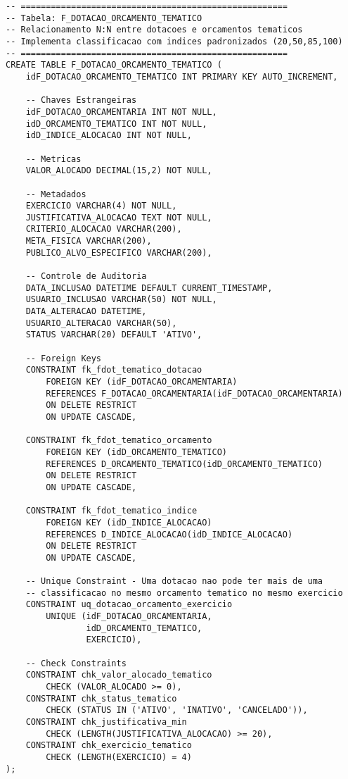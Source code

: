 \documentclass[12pt,a4paper]{article}
\begin{document}
\begin{lstlisting}
-- =====================================================
-- Tabela: F_DOTACAO_ORCAMENTO_TEMATICO
-- Relacionamento N:N entre dotacoes e orcamentos tematicos
-- Implementa classificacao com indices padronizados (20,50,85,100)
-- =====================================================
CREATE TABLE F_DOTACAO_ORCAMENTO_TEMATICO (
    idF_DOTACAO_ORCAMENTO_TEMATICO INT PRIMARY KEY AUTO_INCREMENT,
    
    -- Chaves Estrangeiras
    idF_DOTACAO_ORCAMENTARIA INT NOT NULL,
    idD_ORCAMENTO_TEMATICO INT NOT NULL,
    idD_INDICE_ALOCACAO INT NOT NULL,
    
    -- Metricas
    VALOR_ALOCADO DECIMAL(15,2) NOT NULL,
    
    -- Metadados
    EXERCICIO VARCHAR(4) NOT NULL,
    JUSTIFICATIVA_ALOCACAO TEXT NOT NULL,
    CRITERIO_ALOCACAO VARCHAR(200),
    META_FISICA VARCHAR(200),
    PUBLICO_ALVO_ESPECIFICO VARCHAR(200),
    
    -- Controle de Auditoria
    DATA_INCLUSAO DATETIME DEFAULT CURRENT_TIMESTAMP,
    USUARIO_INCLUSAO VARCHAR(50) NOT NULL,
    DATA_ALTERACAO DATETIME,
    USUARIO_ALTERACAO VARCHAR(50),
    STATUS VARCHAR(20) DEFAULT 'ATIVO',
    
    -- Foreign Keys
    CONSTRAINT fk_fdot_tematico_dotacao 
        FOREIGN KEY (idF_DOTACAO_ORCAMENTARIA) 
        REFERENCES F_DOTACAO_ORCAMENTARIA(idF_DOTACAO_ORCAMENTARIA)
        ON DELETE RESTRICT
        ON UPDATE CASCADE,
        
    CONSTRAINT fk_fdot_tematico_orcamento 
        FOREIGN KEY (idD_ORCAMENTO_TEMATICO) 
        REFERENCES D_ORCAMENTO_TEMATICO(idD_ORCAMENTO_TEMATICO)
        ON DELETE RESTRICT
        ON UPDATE CASCADE,
        
    CONSTRAINT fk_fdot_tematico_indice 
        FOREIGN KEY (idD_INDICE_ALOCACAO) 
        REFERENCES D_INDICE_ALOCACAO(idD_INDICE_ALOCACAO)
        ON DELETE RESTRICT
        ON UPDATE CASCADE,
    
    -- Unique Constraint - Uma dotacao nao pode ter mais de uma 
    -- classificacao no mesmo orcamento tematico no mesmo exercicio
    CONSTRAINT uq_dotacao_orcamento_exercicio 
        UNIQUE (idF_DOTACAO_ORCAMENTARIA, 
                idD_ORCAMENTO_TEMATICO, 
                EXERCICIO),
    
    -- Check Constraints
    CONSTRAINT chk_valor_alocado_tematico 
        CHECK (VALOR_ALOCADO >= 0),
    CONSTRAINT chk_status_tematico 
        CHECK (STATUS IN ('ATIVO', 'INATIVO', 'CANCELADO')),
    CONSTRAINT chk_justificativa_min 
        CHECK (LENGTH(JUSTIFICATIVA_ALOCACAO) >= 20),
    CONSTRAINT chk_exercicio_tematico 
        CHECK (LENGTH(EXERCICIO) = 4)
);


\end{lstlisting}
\end{document}
